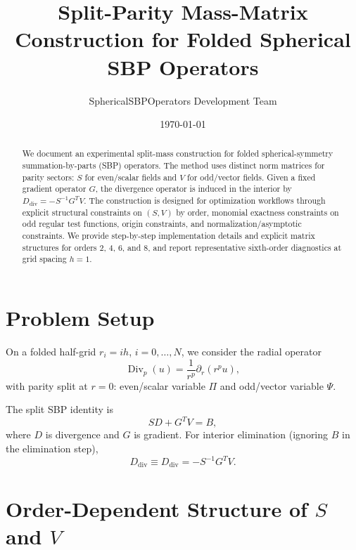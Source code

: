 \documentclass[
  aps,
  pre,
  reprint,
  superscriptaddress,
  nofootinbib
]{revtex4-2}
\newcommand{\Divp}{\operatorname{Div}_{p}}
\newcommand{\Ddiv}{D_{\mathrm{div}}}
\begin{document}
\title{Split-Parity Mass-Matrix Construction for Folded Spherical SBP Operators}

\author{SphericalSBPOperators Development Team}

\date{\today}

\begin{abstract}
We document an experimental split-mass construction for folded spherical-symmetry
summation-by-parts (SBP) operators.
The method uses distinct norm matrices for parity sectors:
$S$ for even/scalar fields and $V$ for odd/vector fields.
Given a fixed gradient operator $G$, the divergence operator is induced in the interior by
$\Ddiv=-S^{-1}G^{T}V$.
The construction is designed for optimization workflows through explicit structural
constraints on $(S,V)$ by order, monomial exactness constraints on odd regular
test functions, origin constraints, and normalization/asymptotic constraints.
We provide step-by-step implementation details and explicit matrix structures for
orders 2, 4, 6, and 8, and report representative sixth-order diagnostics at grid spacing
$h=1$.
\end{abstract}

\maketitle

\section{Problem Setup}
On a folded half-grid $r_i=ih$, $i=0,\dots,N$, we consider the radial operator
\begin{equation}
  \Divp(u)=\frac{1}{r^p}\partial_r(r^p u),
\end{equation}
with parity split at $r=0$:
even/scalar variable $\Pi$ and odd/vector variable $\Psi$.

The split SBP identity is
\begin{equation}
  S D + G^{T}V = B,
\end{equation}
where $D$ is divergence and $G$ is gradient.
For interior elimination (ignoring $B$ in the elimination step),
\begin{equation}
  \Ddiv \equiv D_{\mathrm{div}} = -S^{-1}G^{T}V.
  \label{eq:ddiv}
\end{equation}

\section{Order-Dependent Structure of \texorpdfstring{$S$}{S} and \texorpdfstring{$V$}{V}}
\end{document}
